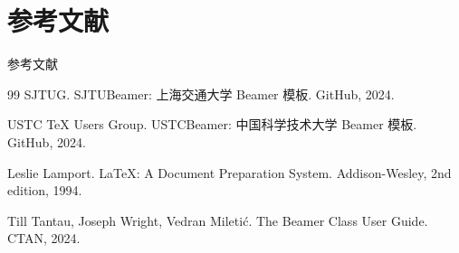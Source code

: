 \documentclass[aspectratio=169, 10pt, UTF8]{ctexbeamer}
\begin{document}
\section{参考文献}

\begin{frame}[allowframebreaks]{参考文献}
  \begin{thebibliography}{99}
    SJTUG.
    \newblock SJTUBeamer: 上海交通大学 Beamer 模板.
    \newblock GitHub, 2024.

    USTC TeX Users Group.
    \newblock USTCBeamer: 中国科学技术大学 Beamer 模板.
    \newblock GitHub, 2024.

    Leslie Lamport.
    \newblock \LaTeX: A Document Preparation System.
    \newblock Addison-Wesley, 2nd edition, 1994.

    Till Tantau, Joseph Wright, Vedran Mileti\'{c}.
    \newblock The Beamer Class User Guide.
    \newblock CTAN, 2024.
  \end{thebibliography}
\end{frame}

\thankyoupage
\end{document}
